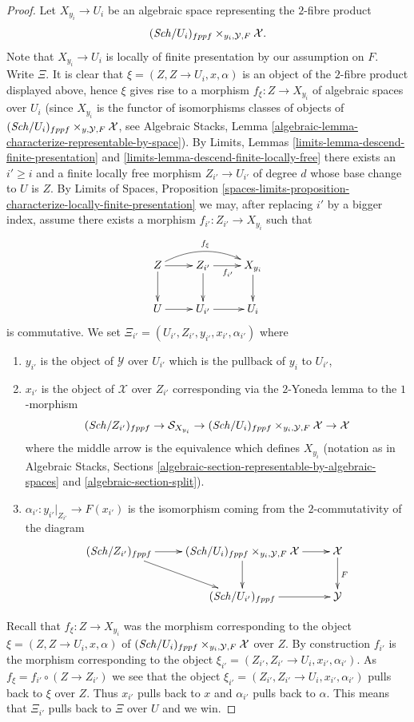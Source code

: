 \begin{proof}
\medskip\noindent
Let $X_{y_i} \to U_i$ be an algebraic space representing the $2$-fibre
product
$$
(\mathit{Sch}/U_i)_{fppf} \times_{y_i, \mathcal{Y}, F} \mathcal{X}.
$$
Note that $X_{y_i} \to U_i$ is locally of finite presentation by our
assumption on $F$. Write $\Xi $. It is clear that
$\xi = (Z, Z \to U_i, x, \alpha)$ is an object of the $2$-fibre product
displayed above, hence $\xi$ gives rise to a morphism
$f_\xi : Z \to X_{y_i}$ of algebraic spaces over $U_i$
(since $X_{y_i}$ is the functor of isomorphisms classes of objects of
$(\mathit{Sch}/U_i)_{fppf} \times_{y, \mathcal{Y}, F} \mathcal{X}$, see
Algebraic Stacks,
Lemma \ref{algebraic-lemma-characterize-representable-by-space}).
By
Limits, Lemmas \ref{limits-lemma-descend-finite-presentation} and
\ref{limits-lemma-descend-finite-locally-free}
there exists an $i' \geq i$ and a finite locally free morphism
$Z_{i'} \to U_{i'}$ of degree $d$ whose base change to $U$ is $Z$. By
Limits of Spaces, Proposition
\ref{spaces-limits-proposition-characterize-locally-finite-presentation}
we may, after replacing $i'$ by a bigger index, assume there exists a
morphism $f_{i'} : Z_{i'} \to X_{y_i}$ such that
$$
\xymatrix{
Z \ar[d] \ar[r] \ar@/^3ex/[rr]^{f_\xi} &
Z_{i'} \ar[d] \ar[r]_{f_{i'}} & X_{y_i} \ar[d] \\
U \ar[r] & U_{i'} \ar[r] & U_i
}
$$
is commutative. We set
$\Xi_{i'} = (U_{i'}, Z_{i'}, y_{i'}, x_{i'}, \alpha_{i'})$
where
\begin{enumerate}
\item $y_{i'}$ is the object of $\mathcal{Y}$ over $U_{i'}$
which is the pullback of $y_i$ to $U_{i'}$,
\item $x_{i'}$ is the object of $\mathcal{X}$ over $Z_{i'}$ corresponding
via the $2$-Yoneda lemma to the $1$-morphism
$$
(\mathit{Sch}/Z_{i'})_{fppf} \to
\mathcal{S}_{X_{y_i}} \to
(\mathit{Sch}/U_i)_{fppf} \times_{y_i, \mathcal{Y}, F} \mathcal{X} \to
\mathcal{X}
$$
where the middle arrow is the equivalence which defines $X_{y_i}$
(notation as in
Algebraic Stacks, Sections
\ref{algebraic-section-representable-by-algebraic-spaces} and
\ref{algebraic-section-split}).
\item $\alpha_{i'} : y_{i'}|_{Z_{i'}} \to F(x_{i'})$ is the isomorphism
coming from the $2$-commutativity of the diagram
$$
\xymatrix{
(\Sch/Z_{i'})_{fppf} \ar[r] \ar[rd] &
(\Sch/U_i)_{fppf} \times_{y_i, \mathcal{Y}, F} \mathcal{X}
\ar[r] \ar[d] &
\mathcal{X} \ar[d]^F \\
& (\Sch/U_{i'})_{fppf} \ar[r] & \mathcal{Y}
}
$$
\end{enumerate}
Recall that $f_\xi : Z \to X_{y_i}$ was the morphism corresponding to
the object $\xi = (Z, Z \to U_i, x, \alpha)$ of
$(\mathit{Sch}/U_i)_{fppf} \times_{y_i, \mathcal{Y}, F} \mathcal{X}$
over $Z$. By construction $f_{i'}$ is the morphism corresponding to
the object $\xi_{i'} = (Z_{i'}, Z_{i'} \to U_i, x_{i'}, \alpha_{i'})$.
As $f_\xi = f_{i'} \circ (Z \to Z_{i'})$ we see that
the object $\xi_{i'} = (Z_{i'}, Z_{i'} \to U_i, x_{i'}, \alpha_{i'})$ pulls
back to $\xi$ over $Z$. Thus $x_{i'}$ pulls back to $x$ and $\alpha_{i'}$
pulls back to $\alpha$. This means that $\Xi_{i'}$ pulls back
to $\Xi$ over $U$ and we win.
\end{proof}
